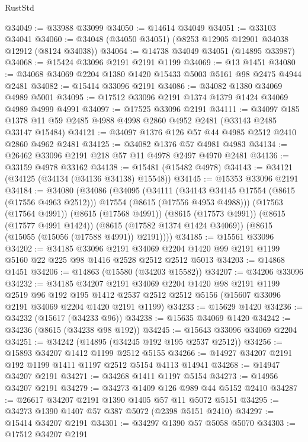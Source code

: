 \begin{lexlean}{RustStd}
\begin{coremodule}
@34049 := @33988 @33099
@34050 := @14614 @34049
@34051 := @33103 @34041
@34060 := @34048 (@34050 @34051) (@8253 @12905 @12901 @34038 @12912 (@8124 @34038))
@34064 := @14738 @34049 @34051 (@14895 @33987)
@34068 := @15424 @33096 @2191 @2191 @1199
@34069 := @13 @1451
@34080 := @34068 @34069 @2204 @1380 @1420 @15433 @5003 @5161 @98 @2475 @4944 @2481
@34082 := @15414 @33096 @2191
@34086 := @34082 @1380 @34069 @4989 @5001
@34095 := @17512 @33096 @2191 @1374 @1379 @1424 @34069 @4989 @4999 @4991
@34097 := @17525 @33096 @2191
@34111 := @34097 @185 @1378 @11 @59 @2485 @4988 @4998 @2860 @4952 @2481 (@33143 @2485 @33147 @15484)
@34121 := @34097 @1376 @126 @57 @44 @4985 @2512 @2410 @2860 @4962 @2481
@34125 := @34082 @1376 @57 @4981 @4983
@34134 := @26462 @33096 @2191 @218 @57 @11 @4978 @2497 @4970 @2481
@34136 := @33159 @4978 @33162
@34138 := @15481 (@15482 @4978)
@34143 := @34121 (@34125 (@34134 (@34136 @34138) @15548))
@34145 := @15353 @33096 @2191
@34184 := @34080
    (@34086
      (@34095
        (@34111
          (@34143 @34145 @17554 (@8615 (@17556 @4963 @2512)))
          @17554
          (@8615 (@17556 @4953 @4988)))
        (@17563 (@17564 @4991))
        (@8615 (@17568 @4991))
        (@8615 (@17573 @4991))
        (@8615 (@17577 @4991 @1424))
        (@8615 (@17582 @1374 @1424 @34069))
        (@8615 (@15055 (@15056 (@17588 @4991)) @2191))))
@34185 := @15561 @33096
@34202 := @34185
    @33096
    @2191
    @34069
    @2204
    @1420
    @99
    @2191
    @1199
    @5160
    @22
    @225
    @98
    @1416
    @2528
    @2512
    @2512
    @5013
@34203 := @14868 @1451
@34206 := @14863 (@15580 (@34203 @15582))
@34207 := @34206 @33096
@34232 := @34185
    @34207
    @2191
    @34069
    @2204
    @1420
    @98
    @2191
    @1199
    @2519
    @96
    @192
    @195
    @1412
    @2537
    @2512
    @2512
    @5156
    (@15607 @33096 @2191 @34069 @2204 @1420 @2191 @1199)
@34233 := @15629 @1420
@34236 := @34232 (@15617 (@34233 @96))
@34238 := @15635 @34069 @1420
@34242 := @34236 (@8615 (@34238 @98 @192))
@34245 := @15643 @33096 @34069 @2204
@34251 := @34242 (@14895 (@34245 @192 @195 @2537 @2512))
@34256 := @15893 @34207 @1412 @1199 @2512 @5155
@34266 := @14927 @34207 @2191 @192 @1199 @1411 @1197 @2512 @5154 @4113 @14941
@34268 := @14947 @34207 @2191
@34271 := @34268 @1411 @1197 @5154
@34273 := @14956 @34207 @2191
@34279 := @34273 @1409 @126 @989 @44 @5152 @2410
@34287 := @26617 @34207 @2191 @1390 @1405 @57 @11 @5072 @5151
@34295 := @34273 @1390 @1407 @57 @387 @5072 (@2398 @5151 @2410)
@34297 := @15414 @34207 @2191
@34301 := @34297 @1390 @57 @5058 @5070
@34303 := @17512 @34207 @2191

\end{coremodule}
\end{lexlean}
